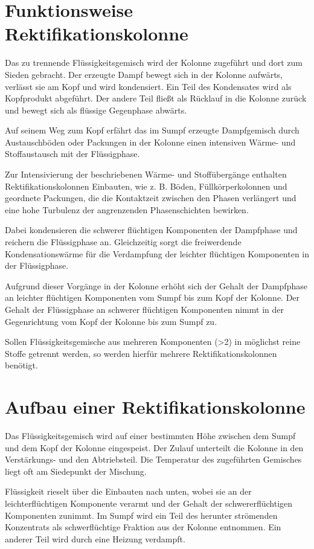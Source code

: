 \documentclass[12pt,a4paper,bibtotocnumbered,liststotocnumbered]{scrreprt}
\begin{document}
\section{Funktionsweise Rektifikationskolonne}
Das zu trennende Flüssigkeitsgemisch wird der Kolonne zugeführt und dort zum Sieden gebracht. Der erzeugte Dampf bewegt sich in der Kolonne aufwärts, verlässt sie am Kopf und wird kondensiert. Ein Teil des Kondensates wird als Kopfprodukt abgeführt. Der andere Teil fließt als Rücklauf in die Kolonne zurück und bewegt sich als flüssige Gegenphase abwärts.

Auf seinem Weg zum Kopf erfährt das im Sumpf erzeugte Dampfgemisch durch Austauschböden oder 
Packungen in der Kolonne einen intensiven Wärme- und Stoffaustausch mit der Flüssigphase. 

Zur Intensivierung der beschriebenen Wärme- und Stoffübergänge enthalten Rektifikationskolonnen Einbauten, wie z. B. Böden, Füllkörperkolonnen und geordnete Packungen, die die Kontaktzeit zwischen den Phasen verlängert und eine hohe Turbulenz der angrenzenden Phasenschichten bewirken.

Dabei kondensieren die schwerer flüchtigen Komponenten der Dampfphase und reichern die Flüssigphase an. Gleichzeitig sorgt die freiwerdende Kondensationswärme für die Verdampfung der leichter flüchtigen Komponenten in der Flüssigphase.

Aufgrund dieser Vorgänge in der Kolonne erhöht sich der Gehalt der Dampfphase an leichter flüchtigen 
Komponenten vom Sumpf bis zum Kopf der Kolonne. Der Gehalt der Flüssigphase an schwerer flüchtigen Komponenten nimmt in der Gegenrichtung vom Kopf der Kolonne bis zum Sumpf zu.

Sollen Flüssigkeitsgemische aus mehreren Komponenten (>2) in möglichst reine Stoffe getrennt werden, so werden hierfür mehrere Rektifikationskolonnen benötigt. 

\section{Aufbau einer Rektifikationskolonne}
Das Flüssigkeitsgemisch wird auf einer bestimmten Höhe zwischen dem Sumpf und dem Kopf der Kolonne eingespeist. Der Zulauf unterteilt die Kolonne in den Verstärkungs- und den Abtriebsteil. Die Temperatur des zugeführten Gemisches liegt oft am Siedepunkt der Mischung.

Flüssigkeit rieselt über die Einbauten nach unten, wobei sie an der leichterflüchtigen Komponente verarmt und der Gehalt der schwererflüchtigen Komponenten zunimmt. Im Sumpf wird ein Teil des herunter strömenden Konzentrats als schwerflüchtige Fraktion aus der Kolonne entnommen. Ein anderer Teil wird durch eine Heizung verdampft. 
\end{document}
